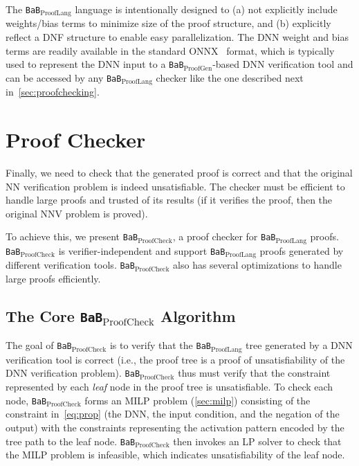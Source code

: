 \documentclass[oneside,11pt,dvipsnames]{book}
\numberwithin{equation}{section}
\theoremstyle{definition}
\theoremstyle{remark}
\newcommand{\proofgen}{\texttt{BaB$_{\text{ProofGen}}$}}
\newcommand{\prooflang}{\texttt{BaB$_{\text{ProofLang}}$}}
\newcommand{\proofcheck}{\texttt{BaB$_{\text{ProofCheck}}$}}
\begin{document}
The \prooflang{} language is intentionally designed to (a) not explicitly include weights/bias terms to minimize size of the proof structure, and (b) explicitly reflect a DNF structure to enable easy parallelization.
The DNN weight and bias terms are readily available in the standard ONNX~\cite{onnx} format, which is typically used to represent the DNN input to a \proofgen{}-based DNN verification tool and can be accessed by any \prooflang{} checker like the one described next in~\autoref{sec:proofchecking}.


\section{Proof Checker}\label{sec:proofchecking}
Finally, we need to check that the generated proof is correct and that the original NN verification problem is indeed unsatisfiable. The checker must be efficient to handle large proofs and trusted of its results (if it verifies the proof, then the original NNV problem is proved).


To achieve this, we present \proofcheck{}, a proof checker for \prooflang{} proofs.
\proofcheck{} is verifier-independent and support \prooflang{} proofs generated by different verification tools. \proofcheck{} also has several optimizations to handle large proofs efficiently.

\subsection{The Core \proofcheck{} Algorithm}


The goal of \proofcheck{} is to verify that the \prooflang{} tree generated by a DNN verification tool is correct (i.e., the proof tree is a proof of unsatisfiability of the DNN verification problem).
\proofcheck{} thus must verify that the constraint represented by each \emph{leaf} node in the proof tree is unsatisfiable. To check each node, \proofcheck{} forms an MILP problem (\autoref{sec:milp}) consisting of the constraint in~\autoref{eq:prop} (the DNN, the input condition, and the negation of the output) with the constraints representing the activation pattern encoded by the tree path to the leaf node. \proofcheck{} then invokes an LP solver to check that the MILP problem is infeasible, which indicates unsatisfiability of the leaf node. 
\end{document}

